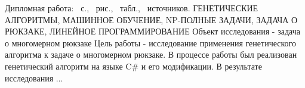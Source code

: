 ﻿
Дипломная работа: \pageref*{LastPage}~с., \totfig~рис., \tottab~табл., \totref~источников.
ГЕНЕТИЧЕСКИЕ АЛГОРИТМЫ, МАШИННОЕ ОБУЧЕНИЕ, NP-ПОЛНЫЕ ЗАДАЧИ, ЗАДАЧА О РЮКЗАКЕ, ЛИНЕЙНОЕ ПРОГРАММИРОВАНИЕ
Объект исследования - задача о многомерном рюкзаке
Цель работы - исследование применения генетического алгоритма к задаче о многомерном рюкзаке.
В процессе работы был реализован генетический алгоритм на языке C\# и его модификации.
В результате исследования ...